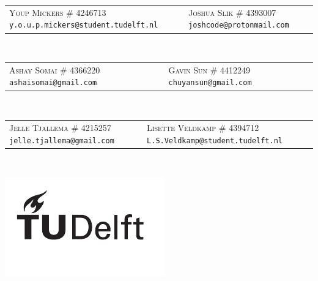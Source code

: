 \begin{titlepage}
\begin{center}
		\begin{tabular}{C{7cm} C{7cm}}
			\textsc{Youp Mickers} \newline
				\textsc{\# 4246713} \newline
				\texttt{y.o.u.p.mickers@student.tudelft.nl}	&
			\textsc{Joshua Slik} \newline
				\textsc{\# 4393007} \newline
				\texttt{joshcode@protonmail.com}
		\end{tabular}
		\\[2mm]
		\begin{tabular}{C{7cm} C{7cm}}
			\textsc{Ashay Somai} \newline
				\textsc{\# 4366220} \newline
				\texttt{ashaisomai@gmail.com} &
			\textsc{Gavin Sun} \newline
				\textsc{\# 4412249} \newline
				\texttt{chuyansun@gmail.com}
		\end{tabular}
		\\[2mm]
		\begin{tabular}{C{7cm} C{7cm}}
			\textsc{Jelle Tjallema} \newline
				\textsc{\# 4215257} \newline
				\texttt{jelle.tjallema@gmail.com}	&
			\textsc{Lisette Veldkamp} \newline
				\textsc{\# 4394712} \newline
				\texttt{L.S.Veldkamp@student.tudelft.nl}
		\end{tabular}
		\\[5mm]
	\end{center}
	\vfill
	\includegraphics{./contents/graphics/TU_Deflt_Logo_Black.pdf}
\end{titlepage}